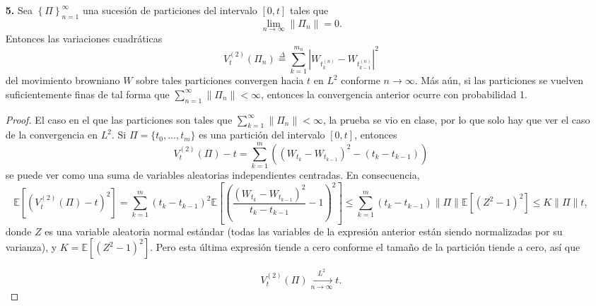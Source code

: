 \documentclass[letterpaper]{article}
\renewcommand{\to}{\rightarrow}
\newcommand{\E}{\mathbb{E}}
\newcommand{\1}{\mathds{1}}
\theoremstyle{definition}
\theoremstyle{definition}
\theoremstyle{definition}
\theoremstyle{definition}
\theoremstyle{definition}
\begin{document}
\begin{enumerate}
\begin{proof}
  
     \end{proof}
    \item [\textbf{5.}] Sea $\left\{\Pi\right\}_{n=1}^{\infty}$ una
    sucesión de particiones del intervalo $[0,t]$ tales que 
    \[
    \lim_{n\to \infty} \|\Pi_{n}^{}\|=0.
    \]
    Entonces las variaciones cuadráticas 
    \[
    V_t^{(2)}\left(\Pi_{n}^{}\right)\overset{\Delta}{=}\sum_{k=1}^{m_n}|W_{t_k^{(n)}}-W_{t_{k-1}^{(n)}}|^2    
    \]
    del movimiento browniano $W$ sobre tales particiones convergen hacia $t$ en $L^2$ conforme
    $n\to \infty$. Más aún, si las particiones se vuelven suficientemente finas de tal 
    forma que $\sum_{n=1}^{\infty}\|\Pi_{n}^{}\|<\infty$, entonces la convergencia
    anterior ocurre con probabilidad 1.
    \begin{proof} 
      El caso en el que las particiones son tales que $\sum_{k=1}^{\infty}\|\Pi_n\|<\infty$, la prueba se vio en clase, por lo que
      solo hay que ver el caso de la convergencia en $L^2$.
       Si $\Pi=\{t_0,...,t_m\}$ es una partición del intervalo $[0,t]$, entonces 
       \[
       V_t^{(2)}(\Pi)-t=\sum_{k=1}^{m}\left(\left(W_{t_k}-W_{t_{k-1}}\right)^2-(t_k-t_{k-1})\right) 
       \]
       se puede ver como una suma de variables aleatorias independientes centradas. En consecuencia, 
       \[
       \E\left[(V_{t}^{(2)}(\Pi)-t)^2\right]=\sum_{k=1}^{m}(t_k-t_{k-1})^2\E\left[\left(\frac{(W_{t_k}-W_{t_{k-1}})^2}{t_k-t_{k-1}}-1\right)^2\right]\leq \sum_{k=1}^m(t_k-t_{k-1})\|\Pi\| \E\left[(Z^2-1)^2\right]\leq K\|\Pi\|t, 
       \]
       donde $Z$ es una variable aleatoria normal estándar (todas las variables de la expresión
       anterior están siendo normalizadas por su varianza), y $K=\E\left[(Z^2-1)^2\right]$. Pero esta última expresión tiende a cero conforme
       el tamaño de la partición tiende a cero, así que 
       
       \[
        V_t^{(2)}(\Pi)\xrightarrow[n\to \infty]{L^2} t.
       \]
     \end{proof}
\end{enumerate}
\end{document}
